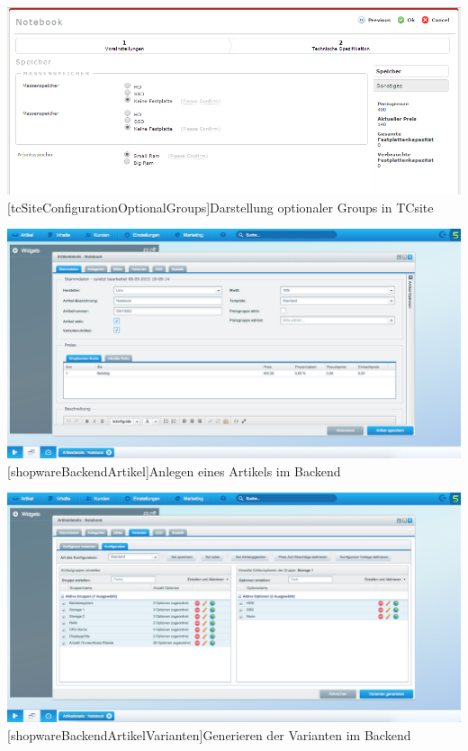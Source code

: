 \begin{appendix}
\vspace{1em}
\begin{minipage}{\linewidth}
	\centering
	\includegraphics[width=1\linewidth]{Abbildungen/tcSiteConfigurationOptionalGroups.PNG}
	[tcSiteConfigurationOptionalGroups]{Darstellung optionaler Groups in TCsite}
	\label{app:tcSiteConfigurationOptionalGroups}
\end{minipage}
\vspace{1em}

\vspace{1em}
\begin{minipage}{\linewidth}
	\centering
	\includegraphics[width=1\linewidth]{Abbildungen/shopwareBackendArtikel.png}
	[shopwareBackendArtikel]{Anlegen eines Artikels im Backend}
	\label{app:shopwareBackendArtikel}
\end{minipage}
\vspace{1em}

\vspace{1em}
\begin{minipage}{\linewidth}
	\centering
	\includegraphics[width=1\linewidth]{Abbildungen/shopwareBackendArtikelVarianten.png}
	[shopwareBackendArtikelVarianten]{Generieren der Varianten im Backend}
	\label{app:shopwareBackendArtikelVarianten}
\end{minipage}
\vspace{1em}


\end{appendix}
